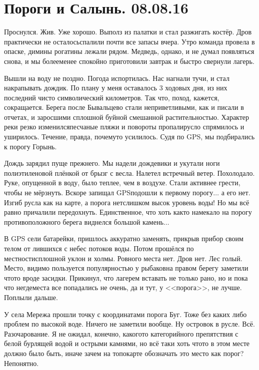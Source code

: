 \chapter{Пороги и Салынь. 08.08.16} 

Проснулся. Жив. Уже хорошо. Выполз из палатки и стал разжигать костёр. Дров практически не осталось\mdash спалили почти все запасы вчера. Утро команда провела в опаске, димины рогатины лежали рядом. Медведь, однако, и не думал появляться снова, и мы более\sdash менее спокойно приготовили завтрак и быстро свернули лагерь. 

Вышли на воду не поздно. Погода испортилась. Нас нагнали тучи, и стал накрапывать дождик. По плану у меня оставалось 3 ходовых дня, из них последний чисто символический километров. Так что, поход, кажется, сокращается. Берега после Бывальцево стали неприветливыми, как и писали в отчетах, и заросшими сплошной буйной смешанной растительностью. Характер реки резко изменился\mdash песчаные пляжи и повороты пропали\mdash русло спрямилось и уширилось. Течение, правда, почему\sdash то усилилось. Судя по GPS, мы подбирались к порогу Горынь.

Дождь зарядил пуще прежнего. Мы надели дождевики и укутали ноги полиэтиленовой плёнкой от брызг с весла. Налетел встречный ветер. Похолодало. Руке, опущенной в воду, было теплее, чем в воздухе. Стали активнее грести, чтобы не мёрзнуть. Вскоре запищал GPS\mdash подошли к первому порогу$\ldots$ а его нет. Изгиб русла как на карте, а порога нет\mdash слишком высок уровень воды! Но мы всё равно причалили передохнуть. Единственное, что хоть как\sdash то намекало на порог\mdash у противоположного берега виднелся большой камень$\ldots$ 

В GPS сели батарейки, пришлось аккуратно заменять, прикрыв прибор своим телом от лившихся с небес потоков воды. Потом прошёлся по местности\mdash сплошной уклон и холмы. Ровного места нет. Дров нет. Лес голый. Место, видимо пользуется популярностью у рыбаков\mdash на правом берегу заметили что\sdash то вроде засидки. Прикинул, что лагерем вставать не только рано, но и пока что негде\mdash места все попадались не очень, да и тут, у <<порога>>, не лучше. Поплыли дальше. 

У села Мережа прошли точку с координатами порога Буг. Тоже без каких либо проблем по высокой воде. Ничего не заметили вообще. Ну островок в русле. Всё. Разочарование. Я не ожидал, конечно, какого\sdash то категорийного препятствия с белой бурлящей водой и острыми камнями, но всё таки хоть что\sdash то в этом месте должно было быть, иначе зачем на топокарте обозначать это место как порог? Непонятно. 

